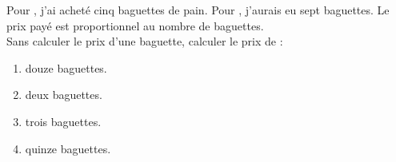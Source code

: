 \begin{exercice*}
   Pour , j'ai acheté cinq baguettes de pain. Pour , j'aurais eu sept baguettes. Le prix payé est proportionnel au nombre de baguettes. \\
Sans calculer le prix d'une baguette, calculer le prix de :
   \begin{multicols}{2}
   \begin{enumerate}
      \item douze baguettes.
      \item deux baguettes.
      \item trois baguettes.
      \item quinze baguettes.
   \end{enumerate}
   \end{multicols}
\end{exercice*}
